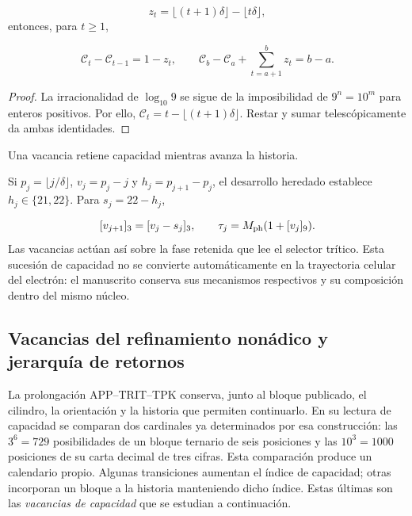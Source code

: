 \[
z_t=\lfloor(t+1)\delta\rfloor-\lfloor t\delta\rfloor,
\]
entonces, para \(t\geq1\),

\[
\mathcal C_t-\mathcal C_{t-1}=1-z_t,
\qquad
\mathcal C_b-\mathcal C_a+\sum_{t=a+1}^b z_t=b-a.
\]
\begin{proof}
La irracionalidad de \(\log_{10}9\) se sigue de la imposibilidad de \(9^n=10^m\) para enteros positivos. Por ello, \(\mathcal C_t=t-\lfloor(t+1)\delta\rfloor\). Restar y sumar telescópicamente da ambas identidades. \end{proof}
Una vacancia retiene capacidad mientras avanza la historia.

Si \(p_j=\lfloor j/\delta\rfloor\), \(v_j=p_j-j\) y \(h_j=p_{j+1}-p_j\), el desarrollo heredado establece \(h_j\in\{21,22\}\). Para \(s_j=22-h_j\),

\[
[v_{j+1}]_3=[v_j-s_j]_3,\qquad
\tau_j=M_{\rm ph}(1+[v_j]_9).
\]
Las vacancias actúan así sobre la fase retenida que lee el selector trítico. Esta sucesión de capacidad no se convierte automáticamente en la trayectoria celular del electrón: el manuscrito conserva sus mecanismos respectivos y su composición dentro del mismo núcleo.


\subsection{Vacancias del refinamiento nonádico y jerarquía de retornos}
\label{viii:vac-add-seccion}

La prolongación APP--TRIT--TPK conserva, junto al bloque publicado, el
cilindro, la orientación y la historia que permiten continuarlo. En su
lectura de capacidad se comparan dos cardinales ya determinados por esa
construcción: las \(3^6=729\) posibilidades de un bloque ternario de seis
posiciones y las \(10^3=1000\) posiciones de su carta decimal de tres
cifras. Esta comparación produce un calendario propio. Algunas
transiciones aumentan el índice de capacidad; otras incorporan un bloque
a la historia manteniendo dicho índice. Estas últimas son las
\emph{vacancias de capacidad} que se estudian a continuación.

